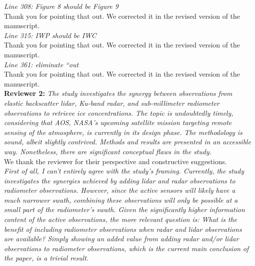 \documentclass[12pt]{article}
\begin{document}
\textit{Line 308: Figure 8 should be Figure 9}\\
\newline
Thank you for pointing that out. We corrected it in the revised version of the manuscript.\\
\newline
\textit{Line 315: IWP should be IWC}\\
\newline
Thank you for pointing that out. We corrected it in the revised version of the manuscript.\\
\newline
\textit{Line 361: eliminate “out}\\
\newline
Thank you for pointing that out. We corrected it in the revised version of the manuscript.\\
\newline
\newline
\clearpage
\noindent \textbf{Reviewer 2:}
\newline \textit{The study investigates the synergy between observations from elastic backscatter lidar, Ku-band radar,
and sub-millimeter radiometer observations to retrieve ice concentrations. The topic is undoubtedly timely,
considering that AOS, NASA's upcoming satellite mission targeting remote sensing of the atmosphere,
is currently in its design phase. The methodology is sound, albeit slightly contrived. Methods and
results are presented in an accessible way.
Nonetheless, there are significant conceptual flaws in the study.}\\
\newline
We thank the reviewer for their perspective and constructive suggestions.\\
\newline
\noindent \textit{First of all, I can't entirely agree with the study's framing. Currently, 
the study investigates the synergies
achieved by adding lidar and radar observations to radiometer observations. 
However, since the active sensors will likely have a much narrower swath, 
combining these observations will only be possible at
a small part of the radiometer's swath. Given the significantly higher information 
content of the active observations, the more relevant question is: What is the 
benefit of including radiometer observations
when radar and lidar observations are available? Simply showing an added value 
from adding radar
and/or lidar observations to radiometer observations, which is the current main 
conclusion of the paper, is a trivial result.}\\
\end{document}

